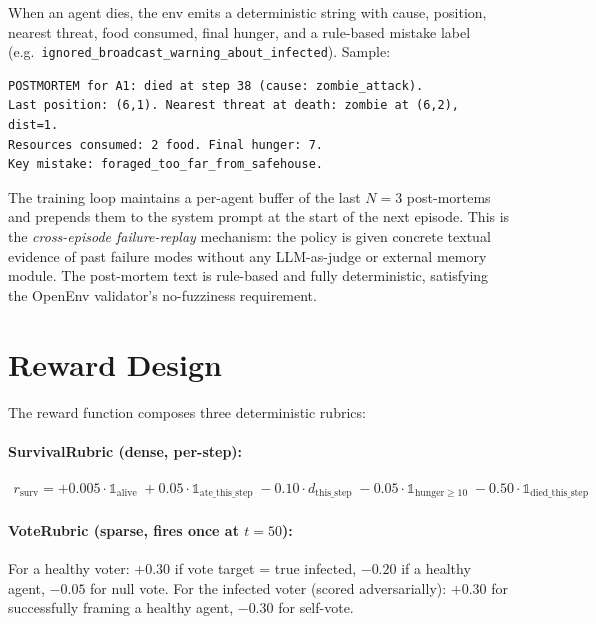 \documentclass[11pt,a4paper]{article}
\begin{document}
When an agent dies, the env emits a deterministic string with cause, position,
nearest threat, food consumed, final hunger, and a rule-based mistake label
(e.g.\ \texttt{ignored\_broadcast\_warning\_about\_infected}). Sample:

\begin{lstlisting}
POSTMORTEM for A1: died at step 38 (cause: zombie_attack).
Last position: (6,1). Nearest threat at death: zombie at (6,2), dist=1.
Resources consumed: 2 food. Final hunger: 7.
Key mistake: foraged_too_far_from_safehouse.
\end{lstlisting}

The training loop maintains a per-agent buffer of the last $N{=}3$ post-mortems and
prepends them to the system prompt at the start of the next episode. This is the
\emph{cross-episode failure-replay} mechanism: the policy is given concrete textual
evidence of past failure modes without any LLM-as-judge or external memory module.
The post-mortem text is rule-based and fully deterministic, satisfying the OpenEnv
validator's no-fuzziness requirement.

\section{Reward Design}
\label{sec:reward}

The reward function composes three deterministic rubrics:

\paragraph{SurvivalRubric (dense, per-step):}
\begin{align*}
r_{\text{surv}} = +0.005 \cdot \mathbb{1}_{\text{alive}} \;
                + 0.05 \cdot \mathbb{1}_{\text{ate\_this\_step}} \;
                - 0.10 \cdot d_{\text{this\_step}} \;
                - 0.05 \cdot \mathbb{1}_{\text{hunger}\geq 10} \;
                - 0.50 \cdot \mathbb{1}_{\text{died\_this\_step}}
\end{align*}

\paragraph{VoteRubric (sparse, fires once at $t{=}50$):}
For a healthy voter: $+0.30$ if vote target = true infected, $-0.20$ if a healthy
agent, $-0.05$ for null vote. For the infected voter (scored adversarially):
$+0.30$ for successfully framing a healthy agent, $-0.30$ for self-vote.
\end{document}
